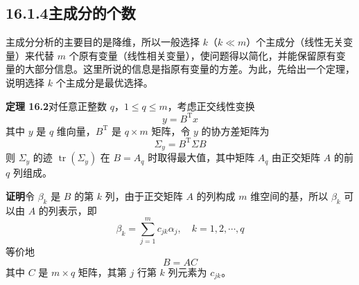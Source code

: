 \documentclass[UTF8,12pt,a4paper,fontset=fandol]{ctexart}
\begin{document}
\subsection*{16.1.4\quad 主成分的个数}

主成分分析的主要目的是降维，所以一般选择 $k$（$k\ll m$）个主成分（线性无关变量）来代替 $m$ 个原有变量（线性相关变量），使问题得以简化，并能保留原有变量的大部分信息。这里所说的信息是指原有变量的方差。为此，先给出一个定理，说明选择 $k$ 个主成分是最优选择。

\noindent\textbf{定理 16.2}\quad 对任意正整数 $q$，$1\leqslant q\leqslant m$，考虑正交线性变换
\begin{equation}
y=B^{\mathrm{T}}x
\tag{16.23}
\end{equation}
其中 $y$ 是 $q$ 维向量，$B^{\mathrm{T}}$ 是 $q\times m$ 矩阵，令 $y$ 的协方差矩阵为
\begin{equation}
\Sigma_y=B^{\mathrm{T}}\Sigma B
\tag{16.24}
\end{equation}
则 $\Sigma_y$ 的迹 $\operatorname{tr}(\Sigma_y)$ 在 $B=A_q$ 时取得最大值，其中矩阵 $A_q$ 由正交矩阵 $A$ 的前 $q$ 列组成。

\noindent\textbf{证明}\quad 令 $\beta_k$ 是 $B$ 的第 $k$ 列，由于正交矩阵 $A$ 的列构成 $m$ 维空间的基，所以 $\beta_k$ 可以由 $A$ 的列表示，即
\[
\beta_k=\sum_{j=1}^m c_{jk}\alpha_j,\quad k=1,2,\cdots,q
\]
等价地
\begin{equation}
B=AC
\tag{16.25}
\end{equation}
其中 $C$ 是 $m\times q$ 矩阵，其第 $j$ 行第 $k$ 列元素为 $c_{jk}$。
\end{document}
